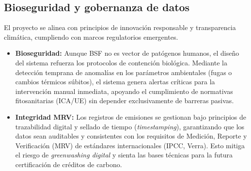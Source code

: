 \subsection{Bioseguridad y gobernanza de datos}
El proyecto se alinea con principios de innovación responsable y transparencia climática, cumpliendo con marcos regulatorios emergentes.

\begin{itemize}
    \item \textbf{Bioseguridad:} Aunque BSF no es vector de patógenos humanos, el diseño del sistema refuerza los protocolos de contención biológica. Mediante la detección temprana de anomalías en los parámetros ambientales (fugas o cambios térmicos súbitos), el sistema genera alertas críticas para la intervención manual inmediata, apoyando el cumplimiento de normativas fitosanitarias (ICA/UE) sin depender exclusivamente de barreras pasivas.
    
    \item \textbf{Integridad MRV:} Los registros de emisiones se gestionan bajo principios de trazabilidad digital y sellado de tiempo (\textit{timestamping}), garantizando que los datos sean auditables y consistentes con los requisitos de Medición, Reporte y Verificación (MRV) de estándares internacionales (IPCC, Verra). Esto mitiga el riesgo de \textit{greenwashing digital} y sienta las bases técnicas para la futura certificación de créditos de carbono.
\end{itemize}